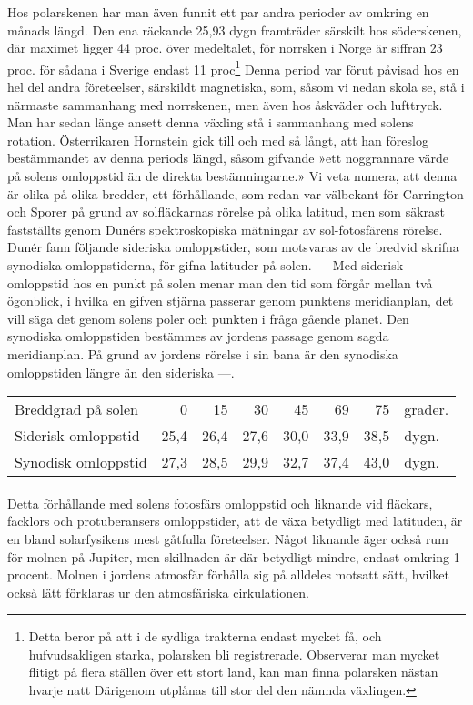 \documentclass[a4paper, 12pt, oneside, swedish]{article}
\begin{document}
Hos polarskenen har man även funnit ett par andra perioder av omkring en månads längd. Den ena räckande 25,93 dygn framträder särskilt hos söderskenen, där maximet ligger 44 proc. över medeltalet, för norrsken i Norge är siffran 23 proc. för sådana i Sverige endast 11 proc\footnote{Detta beror på att i de sydliga trakterna endast mycket få, och hufvudsakligen starka, polarsken bli registrerade. Observerar man mycket flitigt på flera ställen över ett stort land, kan man finna polarsken nästan hvarje natt Därigenom utplånas till stor del den nämnda växlingen.} Denna period var förut påvisad hos en hel del andra företeelser, särskildt magnetiska, som, såsom vi nedan skola se, stå i närmaste sammanhang med norrskenen, men även hos åskväder och lufttryck. Man har sedan länge ansett denna växling stå i sammanhang med solens rotation. Österrikaren Hornstein gick till och med så långt, att han föreslog bestämmandet av denna periods längd, såsom gifvande »ett noggrannare värde på solens omloppstid än de direkta bestämningarne.» Vi veta numera, att denna är olika på olika bredder, ett förhållande, som redan var välbekant för Carrington och Sporer på grund av solfläckarnas rörelse på olika latitud, men som säkrast fastställts genom Dunérs spektroskopiska mätningar av sol-fotosfärens rörelse. Dunér fann följande sideriska omloppstider, som motsvaras av de bredvid skrifna synodiska omloppstiderna, för gifna latituder på solen. --- Med siderisk omloppstid hos en punkt på solen menar man den tid som förgår mellan två ögonblick, i hvilka en gifven stjärna passerar genom punktens meridianplan, det vill säga det genom solens poler och punkten i fråga gående planet. Den synodiska omloppstiden bestämmes av jordens passage genom sagda meridianplan. På grund av jordens rörelse i sin bana är den synodiska omloppstiden längre än den sideriska ---.

\begin{table}[H]
    \centering
    \footnotesize
    \begin{tabular}{l r r r r r r l}
        Breddgrad på solen & 0 & 15 & 30 & 45 & 69 & 75 & grader.   \\
        Siderisk omloppstid & 25,4 & 26,4 & 27,6 & 30,0 & 33,9 & 38,5 & dygn.   \\
        Synodisk omloppstid & 27,3 & 28,5 & 29,9 & 32,7 & 37,4 & 43,0 & dygn. \\
    \end{tabular}
\end{table}
\paragraph{}
Detta förhållande med solens fotosfärs omloppstid och liknande vid fläckars, facklors och protuberansers omloppstider, att de växa betydligt med latituden, är en bland solarfysikens mest gåtfulla företeelser. Något liknande äger också rum för molnen på Jupiter, men skillnaden är där betydligt mindre, endast omkring 1 procent. Molnen i jordens atmosfär förhålla sig på alldeles motsatt sätt, hvilket också lätt förklaras ur den atmosfäriska cirkulationen.
\end{document}
